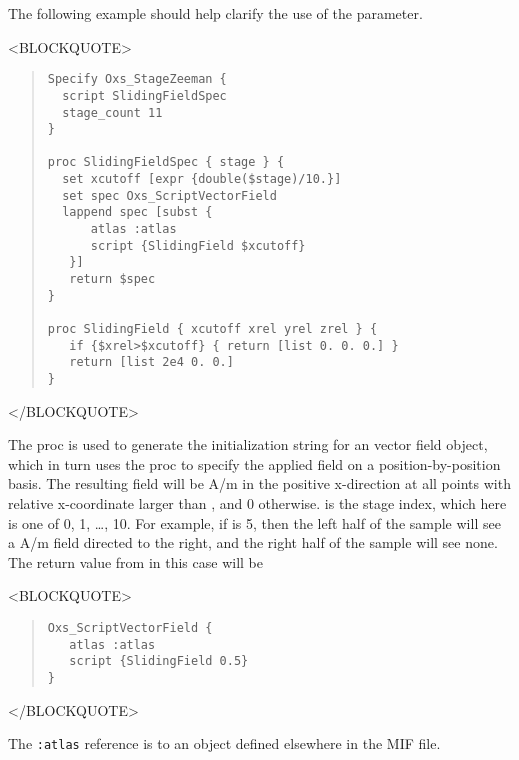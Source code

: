 \begin{itemize}
\begin{description}
   The following example should help clarify the use of the 
   parameter.
\begin{rawhtml}<BLOCKQUOTE>\end{rawhtml}
\begin{quote}
\begin{verbatim}
Specify Oxs_StageZeeman {
  script SlidingFieldSpec
  stage_count 11
}

proc SlidingFieldSpec { stage } {
  set xcutoff [expr {double($stage)/10.}]
  set spec Oxs_ScriptVectorField
  lappend spec [subst {
      atlas :atlas
      script {SlidingField $xcutoff}
   }]
   return $spec
}

proc SlidingField { xcutoff xrel yrel zrel } {
   if {$xrel>$xcutoff} { return [list 0. 0. 0.] }
   return [list 2e4 0. 0.]
}
\end{verbatim}
\end{quote}
\begin{rawhtml}</BLOCKQUOTE>\end{rawhtml}

   The  proc is used to generate the initialization
   string for an  vector field object, which
   in turn uses the  proc to specify the applied field
   on a position-by-position basis.  The resulting field will be
    A/m in the positive x-direction at
   all points with relative x-coordinate larger than ,
   and 0 otherwise.   is the stage index, which here is
   one of 0, 1, \ldots, 10.  For example, if  is 5, then the
   left half of the sample will see a 
   A/m field directed to the right, and the right half of the sample
   will see none.  The return value from  in this
   case will be
\begin{rawhtml}<BLOCKQUOTE>\end{rawhtml}
\begin{quote}
\begin{verbatim}
Oxs_ScriptVectorField {
   atlas :atlas
   script {SlidingField 0.5}
}
\end{verbatim}
\end{quote}
\begin{rawhtml}</BLOCKQUOTE>\end{rawhtml}
   The \verb+:atlas+ reference is to an  object defined
   elsewhere in the MIF file.


\end{description}
\end{itemize}
